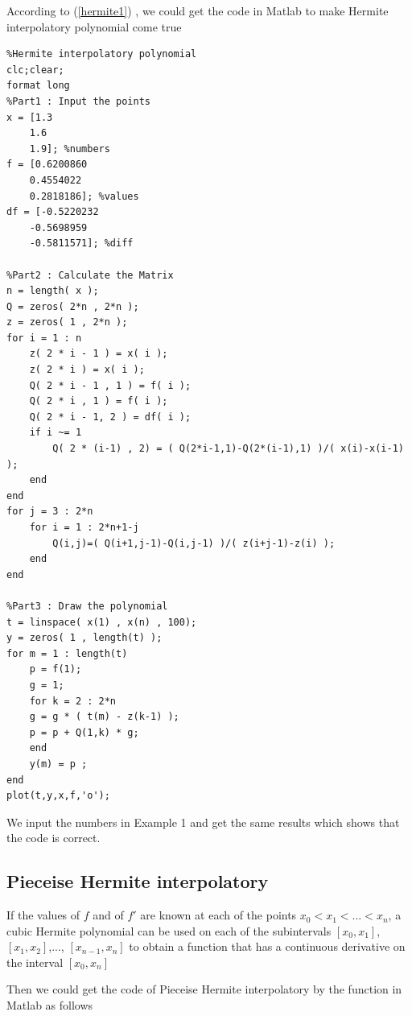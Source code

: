 \documentclass{article}
\begin{document}
According to (\ref{hermite1}) , we could get the code in Matlab to make Hermite interpolatory polynomial come true

\begin{lstlisting}
%Hermite interpolatory polynomial
clc;clear;
format long
%Part1 : Input the points
x = [1.3
    1.6
    1.9]; %numbers
f = [0.6200860
    0.4554022
    0.2818186]; %values
df = [-0.5220232
    -0.5698959
    -0.5811571]; %diff

%Part2 : Calculate the Matrix
n = length( x );
Q = zeros( 2*n , 2*n );
z = zeros( 1 , 2*n );
for i = 1 : n
    z( 2 * i - 1 ) = x( i );
    z( 2 * i ) = x( i );
    Q( 2 * i - 1 , 1 ) = f( i );
    Q( 2 * i , 1 ) = f( i );
    Q( 2 * i - 1, 2 ) = df( i );
    if i ~= 1
        Q( 2 * (i-1) , 2) = ( Q(2*i-1,1)-Q(2*(i-1),1) )/( x(i)-x(i-1) );
    end
end
for j = 3 : 2*n
    for i = 1 : 2*n+1-j
        Q(i,j)=( Q(i+1,j-1)-Q(i,j-1) )/( z(i+j-1)-z(i) );
    end
end

%Part3 : Draw the polynomial
t = linspace( x(1) , x(n) , 100);
y = zeros( 1 , length(t) );
for m = 1 : length(t)
    p = f(1);
    g = 1;
    for k = 2 : 2*n
    g = g * ( t(m) - z(k-1) );
    p = p + Q(1,k) * g;
    end
    y(m) = p ;
end
plot(t,y,x,f,'o');
\end{lstlisting}

We input the numbers in Example 1 and get the same results which shows that the code is correct.


\subsection{Pieceise Hermite interpolatory}

If the values of $f$ and of $f'$ are known at each of the points $x_0 < x_1 < ... < x_n$, a cubic
Hermite polynomial can be used on each of the subintervals $[x_0, x_1]$, $[x_1, x_2]$,..., $[x_{n−1}, x_n]$
to obtain a function that has a continuous derivative on the interval $[x_0, x_n]$

Then we could get the code of Pieceise Hermite interpolatory by the function in Matlab as follows
\end{document}
